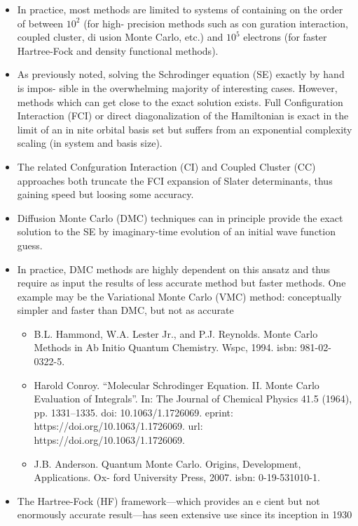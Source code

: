 \documentclass[twoside,english]{uiofysmaster}
\begin{document}
\begin{itemize}
	\item In practice, most methods are limited to systems of containing on the order of between $10^2$ (for high- precision methods such as con guration interaction, coupled cluster, di usion Monte Carlo, etc.) and $10^5$ electrons (for faster Hartree-Fock and density functional methods).
	\cite{Hu2015} \cite{VandeVondele2012} \cite{Bowler2010}
	\item As previously noted, solving the Schrodinger equation (SE) exactly by hand is impos- sible in the overwhelming majority of interesting cases. However, methods which can get close to the exact solution exists. Full Configuration Interaction (FCI) or direct diagonalization of the Hamiltonian is exact in the limit of an in nite orbital basis set but suffers from an exponential complexity scaling (in system and basis size). \cite{Helgaker2000}
	\item The related Confguration Interaction (CI) and Coupled Cluster (CC) approaches both truncate the FCI expansion of Slater determinants, thus gaining speed but loosing some accuracy. \cite{Kvaal2017} \cite{Hammond1994}
	\item Diffusion Monte Carlo (DMC) techniques can in principle provide the exact solution to the SE by imaginary-time evolution of an initial wave function guess. \cite{HjortJensen2015} \cite{Hammond1994}
	\item In practice, DMC methods are highly dependent on this ansatz and thus require as input the results of less accurate method but faster methods. One example may be the Variational Monte Carlo (VMC) method: conceptually simpler and faster than DMC, but not as accurate
	\begin{itemize}
		\item B.L. Hammond, W.A. Lester Jr., and P.J. Reynolds. Monte Carlo Methods in Ab Initio Quantum Chemistry. Wspc, 1994. isbn: 981-02-0322-5.
		\item Harold Conroy. “Molecular Schrodinger Equation. II. Monte Carlo Evaluation of Integrals”. In: The Journal of Chemical Physics 41.5 (1964), pp. 1331–1335. doi: 10.1063/1.1726069. eprint: https://doi.org/10.1063/1.1726069. url: https://doi.org/10.1063/1.1726069.
		\item J.B. Anderson. Quantum Monte Carlo. Origins, Development, Applications. Ox- ford University Press, 2007. isbn: 0-19-531010-1.
	\end{itemize}
	\item The Hartree-Fock (HF) framework—which provides an e cient but not enormously accurate result—has seen extensive use since its inception in 1930

\end{itemize}
\end{document}
